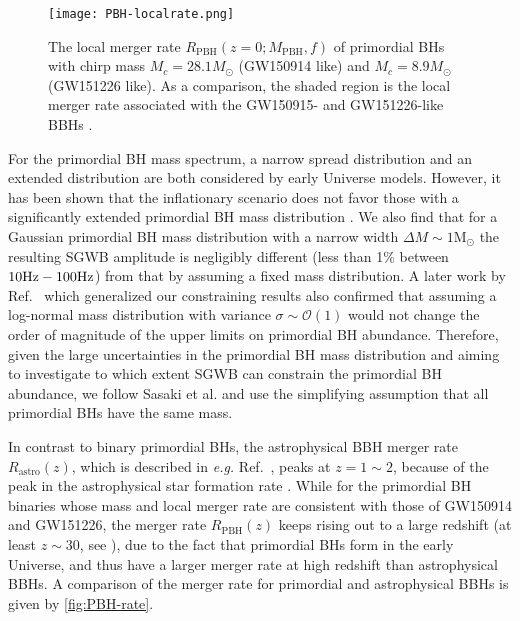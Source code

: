 \begin{figure}[htbp]
	\centering
	\texttt{[image: PBH-localrate.png]}
	\caption{The local merger rate $R_\text{PBH}(z=0;M_\text{PBH},f)$ of primordial \acp{BH} with chirp mass ${M}_c = 28.1 M_\odot$ (GW150914 like) and ${M}_c = 8.9 M_\odot$ (GW151226 like).
	As a comparison, the shaded region is the local merger rate associated with the GW150915- and GW151226-like \acp{BBH} \cite{GW150914rate,O1}.}
	\label{fig:PBH-localrate}
\end{figure}

For the primordial \ac{BH} mass spectrum, a narrow spread distribution \cite{Kawasaki:2012wr,Jedamzik:1999am,Kodama:1982sf,Khlopov:2000js} and an extended distribution \cite{Carr:1975qj,Hawking:1987bn} are both considered by early Universe models.
However, it has been shown that the inflationary scenario does not favor those with a significantly extended primordial \ac{BH} mass distribution \cite{Carr:2016drx}.
We also find that for a Gaussian primordial \ac{BH} mass distribution with a narrow width $\Delta M\sim1\mathrm{M}_\odot$ the resulting \ac{SGWB} amplitude is negligibly different (less than 1\% between $10\rm{Hz}-100\rm{Hz}$) from that by assuming a fixed mass distribution.
A later work by Ref.~\cite{Raidal:2017mfl} which generalized our constraining results also confirmed that assuming a log-normal mass distribution with variance $\sigma\sim\mathcal{O}(1)$ would not change the order of magnitude of the upper limits on primordial \ac{BH} abundance. 
Therefore, given the large uncertainties in the primordial \ac{BH} mass distribution \cite{Carr:2016drx} and aiming to investigate to which extent \ac{SGWB} can constrain the primordial \ac{BH} abundance, we follow Sasaki et al. and use the simplifying assumption that all primordial \acp{BH} have the same mass.

In contrast to binary primordial \acp{BH}, the astrophysical \ac{BBH} merger rate $R_\textrm{astro}(z)$, which is described in \textit{e.g.} Ref.~\cite{TheLIGOScientific:2016wyq}, peaks at $z=1\sim2$, because of the peak in the astrophysical star formation rate \cite{Vangioni:2014axa}.
While for the primordial \ac{BH} binaries whose mass and local merger rate are consistent with those of GW150914 and GW151226, the merger rate $R_\textrm{PBH}(z)$ keeps rising out to a large redshift (at least $z\sim30$, see \cite{Nakamura:2016hna}), due to the fact that primordial \acp{BH} form in the early Universe, and thus have a larger merger rate at high redshift than astrophysical \acp{BBH}.
A comparison of the merger rate for primordial and astrophysical \acp{BBH} is given by \cref{fig:PBH-rate}.

